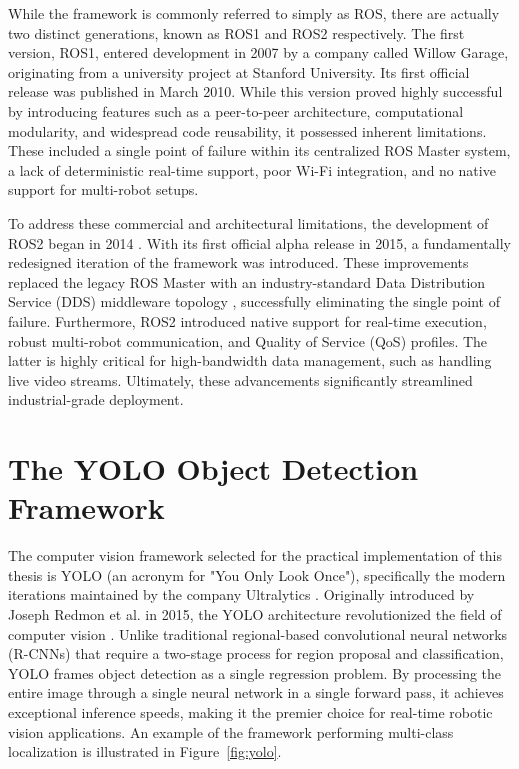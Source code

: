 While the framework is commonly referred to simply as ROS, there are actually two distinct generations, known as ROS1 and ROS2 respectively. The first version, ROS1, entered development in 2007 by a company called Willow Garage, originating from a university project at Stanford University. Its first official release was published in March 2010. While this version proved highly successful by introducing features such as a peer-to-peer architecture, computational modularity, and widespread code reusability, it possessed inherent limitations. These included a single point of failure within its centralized ROS Master system, a lack of deterministic real-time support, poor Wi-Fi integration, and no native support for multi-robot setups.

To address these commercial and architectural limitations, the development of ROS2 began in 2014 \cite{macenski2022ros2}. With its first official alpha release in 2015, a fundamentally redesigned iteration of the framework was introduced. These improvements replaced the legacy ROS Master with an industry-standard Data Distribution Service (DDS) middleware topology \cite{omg2015dds}, successfully eliminating the single point of failure. Furthermore, ROS2 introduced native support for real-time execution, robust multi-robot communication, and Quality of Service (QoS) profiles. The latter is highly critical for high-bandwidth data management, such as handling live video streams. Ultimately, these advancements significantly streamlined industrial-grade deployment.

\section{The YOLO Object Detection Framework} %
The computer vision framework selected for the practical implementation of this thesis is YOLO (an acronym for "You Only Look Once"), specifically the modern iterations maintained by the company Ultralytics \cite{jocher2023ultralytics}. Originally introduced by Joseph Redmon et al. in 2015, the YOLO architecture revolutionized the field of computer vision \cite{redmon2016yolo}. Unlike traditional regional-based convolutional neural networks (R-CNNs) that require a two-stage process for region proposal and classification, YOLO frames object detection as a single regression problem. By processing the entire image through a single neural network in a single forward pass, it achieves exceptional inference speeds, making it the premier choice for real-time robotic vision applications. An example of the framework performing multi-class localization is illustrated in Figure~\ref{fig:yolo}.

